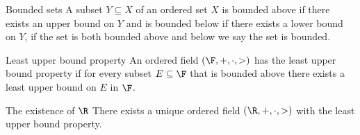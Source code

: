 \documentclass{report}
\begin{document}
\begin{definition}{Bounded sets}{}
  A subset $Y \subseteq X$ of an ordered set $X$
  is bounded above if there exists an upper bound on $Y$
  and is bounded below if there exists a lower bound on $Y$,
  if the set is both bounded above and below we say the set is bounded.
\end{definition}

\begin{definition}{Least upper bound property}{}
  An ordered field $\left(\F, +, \cdot, >\right)$ has the least upper bound property if
  for every subset $E \subseteq \F$ that is bounded above there exists a least upper bound on $E$ in $\F$.
\end{definition}

\begin{fact}{The existence of $\R$}{}
  There exists a unique ordered field $(\R, +, \cdot, >)$ with the least upper bound property.
\end{fact}
\end{document}
